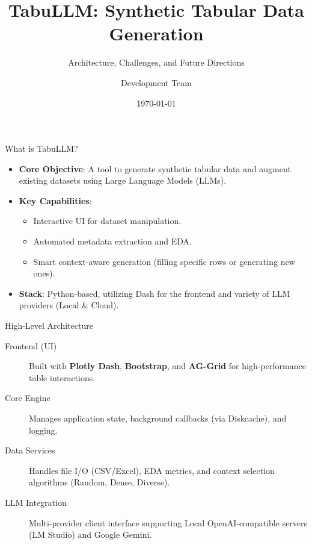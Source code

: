\documentclass{beamer}
\title[TabuLLM Architecture]{TabuLLM: Synthetic Tabular Data Generation}
\subtitle{Architecture, Challenges, and Future Directions}
\author{Development Team}
\date{\today}
\begin{document}
\begin{frame}
    \titlepage
\end{frame}

\begin{frame}{What is TabuLLM?}
    \begin{itemize}
        \item \textbf{Core Objective}: A tool to generate synthetic tabular data and augment existing datasets using Large Language Models (LLMs).
        \item \textbf{Key Capabilities}:
        \begin{itemize}
            \item Interactive UI for dataset manipulation.
            \item Automated metadata extraction and EDA.
            \item Smart context-aware generation (filling specific rows or generating new ones).
        \end{itemize}
        \item \textbf{Stack}: Python-based, utilizing Dash for the frontend and variety of LLM providers (Local \& Cloud).
    \end{itemize}
\end{frame}

\begin{frame}{High-Level Architecture}
    \begin{description}
        \item[Frontend (UI)] Built with \textbf{Plotly Dash}, \textbf{Bootstrap}, and \textbf{AG-Grid} for high-performance table interactions.
        \item[Core Engine] Manages application state, background callbacks (via Diskcache), and logging.
        \item[Data Services] Handles file I/O (CSV/Excel), EDA metrics, and context selection algorithms (Random, Dense, Diverse).
        \item[LLM Integration] Multi-provider client interface supporting Local OpenAI-compatible servers (LM Studio) and Google Gemini.
    \end{description}
\end{frame}
\end{document}
